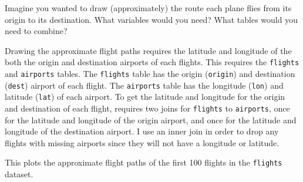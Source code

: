 \documentclass[]{book}
\newenvironment{Shaded}{\begin{snugshade}}{\end{snugshade}}
\newcommand{\DataTypeTok}[1]{\textcolor[rgb]{0.13,0.29,0.53}{#1}}
\newcommand{\KeywordTok}[1]{\textcolor[rgb]{0.13,0.29,0.53}{\textbf{#1}}}
\newcommand{\NormalTok}[1]{#1}
\newcommand{\OperatorTok}[1]{\textcolor[rgb]{0.81,0.36,0.00}{\textbf{#1}}}
\newcommand{\StringTok}[1]{\textcolor[rgb]{0.31,0.60,0.02}{#1}}
\theoremstyle{plain}
\theoremstyle{remark}
\begin{document}
Imagine you wanted to draw (approximately) the route each plane flies from its origin to its destination. What variables would you need? What tables would you need to combine?

Drawing the approximate flight paths requires the latitude and longitude of the both the origin and destination airports of each flights.
This requires the \texttt{flights} and \texttt{airports} tables.
The \texttt{flights} table has the origin (\texttt{origin}) and destination (\texttt{dest}) airport of each flight.
The \texttt{airports} table has the longitude (\texttt{lon}) and latitude (\texttt{lat}) of each airport.
To get the latitude and longitude for the origin and destination of each flight,
requires two joins for \texttt{flights} to \texttt{airports},
once for the latitude and longitude of the origin airport,
and once for the latitude and longitude of the destination airport.
I use an inner join in order to drop any flights with missing airports since they will not have a longitude or latitude.

\begin{Shaded}
\end{Shaded}

This plots the approximate flight paths of the first 100 flights in the \texttt{flights} dataset.
\end{document}
